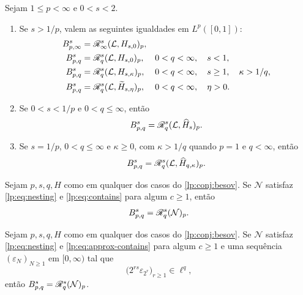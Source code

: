 \documentclass[12pt,a4paper]{article}
\begin{document}
\begin{teorema}
\label{lp:conj:besov}
Sejam $1\le p<\infty$ e $0<s<2$.
\begin{enumerate}[label=(\roman*)]
\item Se $s>1/p$, valem as seguintes igualdades em $L^p([0,1])$:
\begin{align}
 B^{s}_{p,\infty}
 &=\mathscr R^{s}_{\infty}(\mathcal L,H_{s,0})_p,
 &&\label{lp:eq:conj-endpoint}\\
 B^{s}_{p,q}
 &=\mathscr R^{s}_{q}(\mathcal L,H_{s,0})_p,
 &&0<q<\infty,\quad s<1,\label{lp:eq:conj-subcritical}\\
 B^{s}_{p,q}
 &=\mathscr R^{s}_{q}(\mathcal L,H_{s,\kappa})_p,
 &&0<q<\infty,\quad s\ge1,\quad\kappa>1/q,\label{lp:eq:conj-critical}\\
 B^{s}_{p,q}
 &=\mathscr R^{s}_{q}(\mathcal L,\widetilde H_{s,\eta})_p,
 &&0<q<\infty,\quad\eta>0.
 \label{lp:eq:besov-tilde}
\end{align}
\item Se $0<s<1/p$ e $0<q\le\infty$, então
\begin{equation}
 B^{s}_{p,q}=\mathscr R^{s}_{q}(\mathcal L,\widehat H_{s})_p.
 \label{lp:eq:conj-low}
\end{equation}
\item Se $s=1/p$, $0<q\le\infty$ e $\kappa\ge0$, com $\kappa>1/q$ quando $p=1$ e $q<\infty$, então
\begin{equation}
 B^{s}_{p,q}=\mathscr R^{s}_{q}(\mathcal L,\widehat H_{q,\kappa})_p.
 \label{lp:eq:conj-diag}
\end{equation}
\end{enumerate}
\end{teorema}

\begin{teorema}
\label{lp:conj:stability}
Sejam $p,s,q,H$ como em qualquer dos casos do \cref{lp:conj:besov}. Se $\mathcal N$ satisfaz \eqref{lp:eq:nesting} e \eqref{lp:eq:contains} para algum $c\ge1$, então
\begin{equation}
 B^{s}_{p,q}=\mathscr R^{s}_{q}(\mathcal N)_p.
 \label{lp:eq:network-realization-p}
\end{equation}
\end{teorema}

\begin{teorema}
\label{lp:thm:approx-stability}
Sejam $p,s,q,H$ como em qualquer dos casos do \cref{lp:conj:besov}. Se $\mathcal N$ satisfaz \eqref{lp:eq:nesting} e \eqref{lp:eq:approx-contains} para algum $c\ge1$ e uma sequência $(\varepsilon_N)_{N\ge1}$ em $[0,\infty)$ tal que
\begin{equation}
 \big(2^{rs}\varepsilon_{2^r}\big)_{r\ge1}\in\ell^q,
 \label{lp:eq:approx-summable}
\end{equation}
então $B^{s}_{p,q}=\mathscr R^{s}_{q}(\mathcal N)_p$.
\end{teorema}
\end{document}
